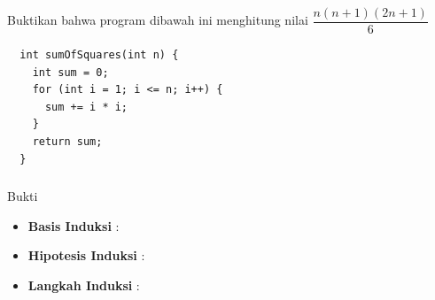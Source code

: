 \documentclass{../praktikum-ppt}
\begin{document}
    \begin{frame}[fragile]
      \frametitle{\insertsection}
      \framesubtitle{\insertsubsection}
      \begin{contoh}
        Buktikan bahwa program dibawah ini menghitung nilai $\dfrac{n(n+1)(2n+1)}{6}$
      \end{contoh}
      \begin{lstlisting}
  int sumOfSquares(int n) {
    int sum = 0;
    for (int i = 1; i <= n; i++) {
      sum += i * i;
    }
    return sum;
  }
      \end{lstlisting}
    \end{frame}

    \begin{frame}
      \frametitle{\insertsection}
      \framesubtitle{\insertsubsection}
      \begin{exampleblock}{Bukti}
        \begin{itemize}
          \item \textbf{Basis Induksi} : 
          \item \textbf{Hipotesis Induksi} : 
          \item \textbf{Langkah Induksi} : 
        \end{itemize}
      \end{exampleblock}
    \end{frame}
\end{document}
